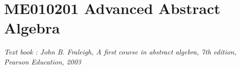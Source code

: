 
\chapter{ME010201 Advanced Abstract Algebra}
\textit{Text book : John B. Fraleigh, A first course in abstract algebra, 7th edition, Pearson Education, 2003}
